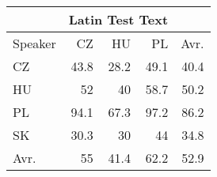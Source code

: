 \begin{tabular}{l|rrr|r}
\hline
 & \multicolumn{3}{c}{Latin Test Text} & \\
\hline
 Speaker   &   CZ &   HU &   PL &   Avr. \\
\hline
 CZ        & 43.8 & 28.2 & 49.1 &   40.4 \\
 HU        & 52   & 40   & 58.7 &   50.2 \\
 PL        & 94.1 & 67.3 & 97.2 &   86.2 \\
 SK        & 30.3 & 30   & 44   &   34.8 \\
\hline
 Avr.     & 55   & 41.4 & 62.2 &   52.9 \\
\hline
\end{tabular}